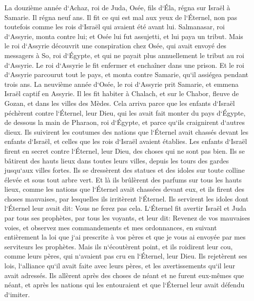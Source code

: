 \verse La douzième année d`Achaz, roi de Juda, Osée, fils d`Éla, régna sur Israël à Samarie. Il régna neuf ans. 
\verse Il fit ce qui est mal aux yeux de l`Éternel, non pas toutefois comme les rois d`Israël qui avaient été avant lui. 
\verse Salmanasar, roi d`Assyrie, monta contre lui; et Osée lui fut assujetti, et lui paya un tribut. 
\verse Mais le roi d`Assyrie découvrit une conspiration chez Osée, qui avait envoyé des messagers à So, roi d`Égypte, et qui ne payait plus annuellement le tribut au roi d`Assyrie. Le roi d`Assyrie le fit enfermer et enchaîner dans une prison. 
\verse Et le roi d`Assyrie parcourut tout le pays, et monta contre Samarie, qu`il assiégea pendant trois ans. 
\verse La neuvième année d`Osée, le roi d`Assyrie prit Samarie, et emmena Israël captif en Assyrie. Il les fit habiter à Chalach, et sur le Chabor, fleuve de Gozan, et dans les villes des Mèdes. 
\verse Cela arriva parce que les enfants d`Israël péchèrent contre l`Éternel, leur Dieu, qui les avait fait monter du pays d`Égypte, de dessous la main de Pharaon, roi d`Égypte, et parce qu`ils craignirent d`autres dieux. 
\verse Ils suivirent les coutumes des nations que l`Éternel avait chassés devant les enfants d`Israël, et celles que les rois d`Israël avaient établies. 
\verse Les enfants d`Israël firent en secret contre l`Éternel, leur Dieu, des choses qui ne sont pas bien. Ils se bâtirent des hauts lieux dans toutes leurs villes, depuis les tours des gardes jusqu`aux villes fortes. 
\verse Ils se dressèrent des statues et des idoles sur toute colline élevée et sous tout arbre vert. 
\verse Et là ils brûlèrent des parfums sur tous les hauts lieux, comme les nations que l`Éternel avait chassées devant eux, et ils firent des choses mauvaises, par lesquelles ils irritèrent l`Éternel. 
\verse Ils servirent les idoles dont l`Éternel leur avait dit: Vous ne ferez pas cela. 
\verse L`Éternel fit avertir Israël et Juda par tous ses prophètes, par tous les voyants, et leur dit: Revenez de vos mauvaises voies, et observez mes commandements et mes ordonnances, en suivant entièrement la loi que j`ai prescrite à vos pères et que je vous ai envoyée par mes serviteurs les prophètes. 
\verse Mais ils n`écoutèrent point, et ils roidirent leur cou, comme leurs pères, qui n`avaient pas cru en l`Éternel, leur Dieu. 
\verse Ils rejetèrent ses lois, l`alliance qu`il avait faite avec leurs pères, et les avertissements qu`il leur avait adressés. Ils allèrent après des choses de néant et ne furent eux-mêmes que néant, et après les nations qui les entouraient et que l`Éternel leur avait défendu d`imiter. 
